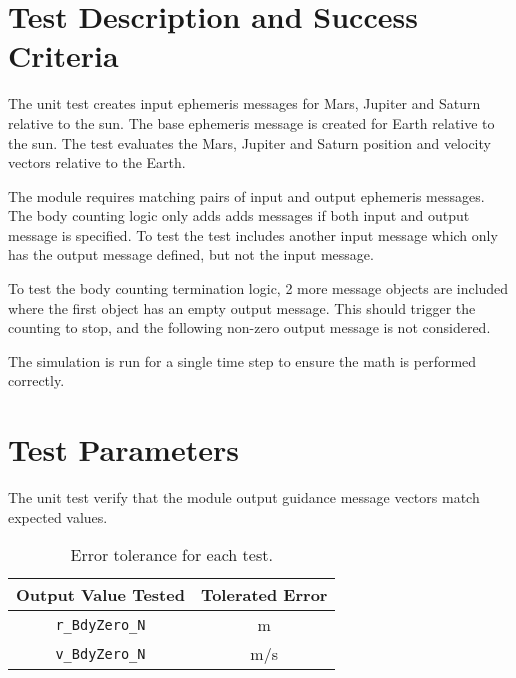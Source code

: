 
\section{Test Description and Success Criteria}
The unit test creates  input ephemeris messages for Mars, Jupiter and Saturn relative to the sun.  The base ephemeris message is created for Earth relative to the sun.  The test evaluates the Mars, Jupiter and Saturn position and velocity vectors relative to the Earth.  

The module requires matching pairs of input and output ephemeris messages.  The body counting logic only adds adds messages if both input and output message is specified.  To test the test includes another input message which only has the output message defined, but not the input message.

To test the body counting termination logic, 2 more message objects are included where the first object has an empty output message. This should trigger the counting to stop, and the following non-zero output message is not considered.

The simulation is run for a single time step to ensure the math is performed correctly.  



\section{Test Parameters}

The unit test verify that the module output guidance message vectors match expected values.
\begin{table}[htbp]
	\caption{Error tolerance for each test.}
	\label{tab:errortol}
	\centering \fontsize{10}{10}\selectfont
	\begin{tabular}{ c | c } %
		\hline\hline
		\textbf{Output Value Tested}  & \textbf{Tolerated Error}  \\ 
		\hline
		{\tt r\_BdyZero\_N}        & m 	   \\ 
		{\tt v\_BdyZero\_N}        & m/s 	   \\ 
		\hline\hline
	\end{tabular}
\end{table}




